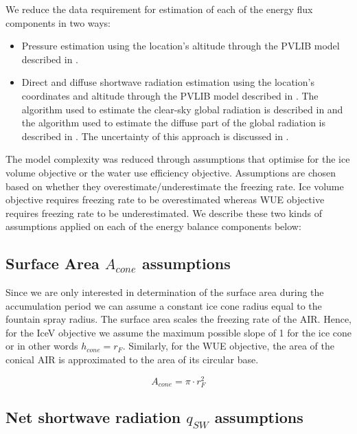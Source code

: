 \documentclass[tc, manuscript]{copernicus}
\begin{document}
We reduce the data requirement for estimation of each of the energy flux components in two ways:

\begin{itemize}
  \item Pressure estimation using the location's altitude through the PVLIB model described in
    \citet{holmgrenPvlibPythonPython2018}.
  \item Direct and diffuse shortwave radiation estimation using the location's coordinates and altitude through the
    PVLIB model described in \citet{holmgrenPvlibPythonPython2018}. The algorithm used to estimate the
    clear-sky global radiation is described in \citet{ineichenBroadbandSimplifiedVersion2008} and the algorithm
    used to estimate the diffuse part of the global radiation is described in
\citet{erbsEstimationDiffuseRadiation1982}. The uncertainty of this approach is discussed in
\cite{ineichenValidationModelsThat2016}. 
\end{itemize}

The model complexity was reduced through assumptions that optimise for the ice volume objective or the water use
efficiency objective. Assumptions are chosen based on whether they overestimate/underestimate the freezing rate.
Ice volume objective requires freezing rate to be overestimated whereas WUE objective requires freezing rate to
be underestimated. We describe these two kinds of assumptions applied on each of the energy balance components
below: 

\subsection{Surface Area $A_{cone}$ assumptions}

Since we are only interested in determination of the surface area during the accumulation period we can assume a
constant ice cone radius equal to the fountain spray radius. The surface area scales the freezing rate of the
AIR. Hence, for the IceV objective we assume the maximum possible slope of 1 for the ice cone or in other words
$h_{cone} = r_{F}$. Similarly, for the WUE objective, the area of the conical AIR is
approximated to the area of its circular base. 

\begin{equation} A_{cone} =\pi \cdot r_{F}^2 \label{eq:Area} \end{equation}

\subsection{Net shortwave radiation \texorpdfstring{$q_{SW}$}{Lg} assumptions}
\label{sec:SW}
\end{document}
